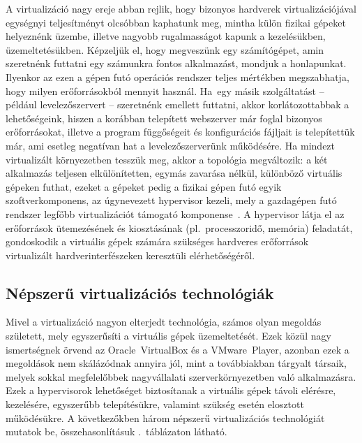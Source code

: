 A virtualizáció nagy ereje abban rejlik, hogy bizonyos hardverek virtualizációjával egységnyi teljesítményt olcsóbban kaphatunk meg, mintha külön fizikai gépeket helyeznénk üzembe, illetve nagyobb rugalmasságot kapunk a kezelésükben, üzemeltetésükben. Képzeljük el, hogy megveszünk egy számítógépet, amin szeretnénk futtatni egy számunkra fontos alkalmazást, mondjuk a honlapunkat. Ilyenkor az ezen a gépen futó operációs rendszer teljes mértékben megszabhatja, hogy milyen erőforrásokból mennyit használ. Ha~egy másik szolgáltatást -- például levelezőszervert -- szeretnénk emellett futtatni, akkor korlátozottabbak a lehetőségeink, hiszen a korábban telepített webszerver már foglal bizonyos erőforrásokat, illetve a program függőségeit és konfigurációs fájljait is telepítettük már, ami esetleg negatívan hat a levelezőszerverünk működésére. Ha mindezt virtualizált környezetben tesszük meg, akkor a topológia megváltozik: a két alkalmazás teljesen elkülönítetten, egymás zavarása nélkül, különböző virtuális gépeken futhat, ezeket a gépeket pedig a fizikai gépen futó egyik szoftverkomponens, az úgynevezett \gls{hypervisor} kezeli, mely a gazdagépen futó rendszer legfőbb virtualizációt támogató komponense~\cite{Sles15virt}. A \gls{hypervisor} látja el az erőforrások ütemezésének és kiosztásának (pl.~processzoridő, memória) feladatát, gondoskodik a virtuális gépek számára szükséges hardveres erőforrások virtualizált hardverinterfészeken keresztüli elérhetőségéről.

\subsection{Népszerű virtualizációs technológiák}
Mivel a virtualizáció nagyon elterjedt technológia, számos olyan megoldás született, mely egyszerűsíti a virtuális gépek üzemeltetését. Ezek közül nagy ismertségnek örvend az Oracle~VirtualBox és a VMware~Player, azonban ezek a megoldások nem skálázódnak annyira jól, mint a továbbiakban tárgyalt társaik, melyek sokkal megfelelőbbek nagyvállalati szerverkörnyezetben való alkalmazásra. Ezek a \gls{hypervisor}ok lehetőséget biztosítanak a virtuális gépek távoli elérésre, kezelésére, egyszerűbb telepítésükre, valamint szükség esetén elosztott működésükre. A következőkben három népszerű virtualizációs technológiát mutatok be, összehasonlításuk .~táblázaton látható.

